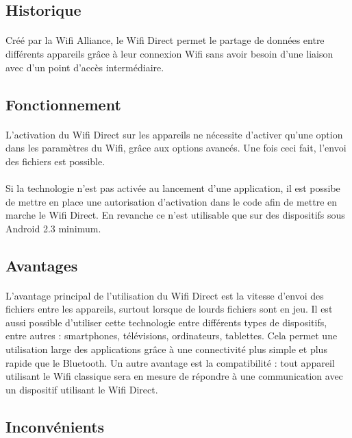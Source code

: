 \documentclass[a4paper,10pt]{report}
\begin{document}
    \subsection{Historique}
      \paragraph{}
      Créé par la Wifi Alliance, le Wifi Direct permet le partage de données entre différents appareils grâce à leur connexion Wifi sans avoir besoin d'une liaison avec d'un point d'accès intermédiaire.
    \subsection{Fonctionnement}
     \paragraph{}
    L'activation du Wifi Direct sur les appareils ne nécessite d'activer qu'une option dans les paramètres du Wifi, grâce aux options avancés. Une fois ceci fait, l'envoi des fichiers est possible.
    \paragraph{}
    Si la technologie n'est pas activée au lancement d'une application, il est possibe de mettre en place une autorisation d'activation dans le code afin de mettre en marche le Wifi Direct. En revanche ce n'est utilisable que sur des dispositifs sous Android 2.3 minimum.
    \subsection{Avantages}
     \paragraph{}
     L'avantage principal de l'utilisation du Wifi Direct est la vitesse d'envoi des fichiers entre les appareils, surtout lorsque de lourds fichiers sont en jeu. 
     Il est aussi possible d'utiliser cette technologie entre différents types de dispositifs, entre autres : smartphones, télévisions, ordinateurs, tablettes. Cela permet une utilisation large des applications grâce à une connectivité plus simple et plus rapide que le Bluetooth. Un autre avantage est la compatibilité : tout appareil utilisant le Wifi classique sera en mesure de répondre à une communication avec un dispositif utilisant le Wifi Direct.
    \subsection{Inconvénients}
\end{document}
